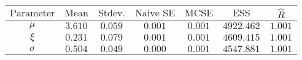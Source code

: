\begin{tabular}{ccccccc}
\toprule
$\textrm{Parameter}$ & $\textrm{Mean}$ & $\textrm{Stdev.}$ & $\textrm{Naive SE}$ & $\textrm{MCSE}$ & $\textrm{ESS}$ & $\hat{R}$\\
\midrule
$\mu$ & $3.610$ & $0.059$ & $0.001$ & $0.001$ & $4922.462$ & $1.001$\\
$\xi$ & $0.231$ & $0.079$ & $0.001$ & $0.001$ & $4609.415$ & $1.001$\\
$\sigma$ & $0.504$ & $0.049$ & $0.000$ & $0.001$ & $4547.881$ & $1.001$\\
\bottomrule
\end{tabular}
